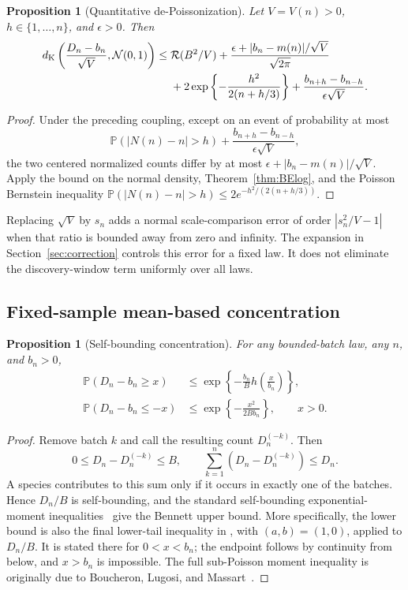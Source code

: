 \documentclass[11pt]{article}
\numberwithin{equation}{section}
\newtheorem{proposition}[theorem]{Proposition}
\theoremstyle{definition}
\theoremstyle{remark}
\newcommand{\Pp}{\mathbb P}
\newcommand{\dK}{d_{\mathrm K}}
\newcommand{\Normal}{\mathcal N(0,1)}
\begin{document}
\begin{proposition}[Quantitative de-Poissonization]\label{prop:quantdepois}
Let $V=V(n)>0$, $h\in\{1,\ldots,n\}$, and $\epsilon>0$. Then
\begin{align}
 \dK\left(\frac{D_n-b_n}{\sqrt V},\Normal\right)
 \le{}&\mathcal R(B^2/V)
 +\frac{\epsilon+|b_n-m(n)|/\sqrt V}{\sqrt{2\pi}}\notag\\
 &+2\exp\left\{-\frac{h^2}{2(n+h/3)}\right\}
 +\frac{b_{n+h}-b_{n-h}}{\epsilon\sqrt V}.
 \label{eq:quantdepois}
\end{align}
\end{proposition}
\begin{proof}
Under the preceding coupling, except on an event of probability at most
\[
 \Pp(|N(n)-n|>h)
 +\frac{b_{n+h}-b_{n-h}}{\epsilon\sqrt V},
\]
the two centered normalized counts differ by at most
$\epsilon+|b_n-m(n)|/\sqrt V$. Apply the bound on the normal density,
Theorem~\ref{thm:BElog}, and the Poisson Bernstein inequality
$\Pp(|N(n)-n|>h)\le2e^{-h^2/(2(n+h/3))}$.
\end{proof}

Replacing $\sqrt V$ by $s_n$ adds a normal scale-comparison error of order
$|s_n^2/V-1|$ when that ratio is bounded away from zero and infinity.
The expansion in Section~\ref{sec:correction} controls this error for a fixed
law. It does not eliminate the discovery-window term uniformly over all laws.

\subsection{Fixed-sample mean-based concentration}

\begin{proposition}[Self-bounding concentration]\label{prop:selfbound}
For any bounded-batch law, any $n$, and $b_n>0$,
\begin{align}
 \Pp(D_n-b_n\ge x)
 &\le\exp\left\{-\frac{b_n}B h\left(\frac{x}{b_n}\right)\right\},\label{eq:fixed-upper}\\
 \Pp(D_n-b_n\le-x)
 &\le\exp\left\{-\frac{x^2}{2Bb_n}\right\},\qquad x>0.\label{eq:fixed-lower}
\end{align}
\end{proposition}
\begin{proof}
Remove batch $k$ and call the resulting count $D_n^{(-k)}$. Then
\[
 0\le D_n-D_n^{(-k)}\le B,\qquad
 \sum_{k=1}^n(D_n-D_n^{(-k)})\le D_n.
\]
A species contributes to this sum only if it occurs in exactly one of the
batches. Hence $D_n/B$ is self-bounding, and the standard self-bounding
exponential-moment inequalities~\cite[p.~1885]{BLM} give the Bennett upper bound. More specifically, the
lower bound is also the final lower-tail inequality in
\cite[Theorem~1]{BLM}, with $(a,b)=(1,0)$, applied to $D_n/B$.
It is stated there for $0<x<b_n$; the endpoint follows by continuity from
below, and $x>b_n$ is impossible. The full sub-Poisson moment inequality is
originally due to Boucheron, Lugosi, and Massart~\cite{BLM2000}.
\end{proof}
\end{document}
